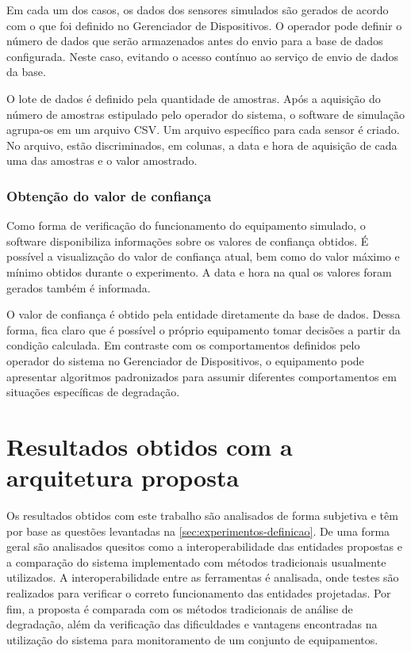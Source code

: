 Em cada um dos casos, os dados dos sensores simulados são gerados de acordo com o que foi definido
no Gerenciador de Dispositivos. O operador pode definir o número de dados que serão armazenados
antes do envio para a base de dados configurada. Neste caso, evitando o acesso contínuo ao serviço
de envio de dados da base.

O lote de dados é definido pela quantidade de amostras. Após a aquisição do número de amostras
estipulado pelo operador do sistema, o software de simulação agrupa-os em um arquivo \gls{CSV}. Um
arquivo específico para cada sensor é criado. No arquivo, estão discriminados, em colunas, a data e
hora de aquisição de cada uma das amostras e o valor amostrado.


\subsubsection{Obtenção do valor de confiança}

Como forma de verificação do funcionamento do equipamento simulado, o software disponibiliza
informações sobre os valores de confiança obtidos. É possível a visualização do valor de confiança
atual, bem como do valor máximo e mínimo obtidos durante o experimento. A data e hora na qual os
valores foram gerados também é informada.

O valor de confiança é obtido pela entidade diretamente da base de dados. Dessa forma, fica claro
que é possível o próprio equipamento tomar decisões a partir da condição calculada. Em contraste com
os comportamentos definidos pelo operador do sistema no Gerenciador de Dispositivos, o equipamento
pode apresentar algoritmos padronizados para assumir diferentes comportamentos em situações
específicas de degradação.


\section{Resultados obtidos com a arquitetura proposta}

Os resultados obtidos com este trabalho são analisados de forma subjetiva e têm por base as questões
levantadas na \cref{sec:experimentos-definicao}. De uma forma geral são analisados quesitos como a
interoperabilidade das entidades propostas e a comparação do sistema implementado com métodos
tradicionais usualmente utilizados. A interoperabilidade entre as ferramentas é analisada, onde
testes são realizados para verificar o correto funcionamento das entidades projetadas. Por fim, a
proposta é comparada com os métodos tradicionais de análise de degradação, além da verificação das
dificuldades e vantagens encontradas na utilização do sistema para monitoramento de um conjunto de
equipamentos.


